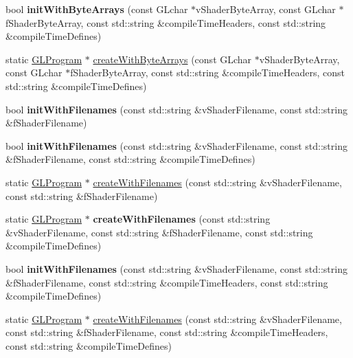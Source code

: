\begin{DoxyCompactItemize}
\item 
\mbox{\label{classGLProgram_a1b576e21f6c54627b93a92a1dfdef7e1}} 
bool {\bfseries init\+With\+Byte\+Arrays} (const G\+Lchar $\ast$v\+Shader\+Byte\+Array, const G\+Lchar $\ast$f\+Shader\+Byte\+Array, const std\+::string \&compile\+Time\+Headers, const std\+::string \&compile\+Time\+Defines)
\item 
static \hyperlink{classGLProgram}{G\+L\+Program} $\ast$ \hyperlink{classGLProgram_a2558f4dd351b6cec829d939e5b31212b}{create\+With\+Byte\+Arrays} (const G\+Lchar $\ast$v\+Shader\+Byte\+Array, const G\+Lchar $\ast$f\+Shader\+Byte\+Array, const std\+::string \&compile\+Time\+Headers, const std\+::string \&compile\+Time\+Defines)
\end{DoxyCompactItemize}
\begin{DoxyCompactItemize}
\item 
\mbox{\label{classGLProgram_a17041a8230ff0ce1c110f05c3f0382c6}} 
bool {\bfseries init\+With\+Filenames} (const std\+::string \&v\+Shader\+Filename, const std\+::string \&f\+Shader\+Filename)
\item 
\mbox{\label{classGLProgram_ab76c957339e44229565377ec53f3e467}} 
bool {\bfseries init\+With\+Filenames} (const std\+::string \&v\+Shader\+Filename, const std\+::string \&f\+Shader\+Filename, const std\+::string \&compile\+Time\+Defines)
\item 
static \hyperlink{classGLProgram}{G\+L\+Program} $\ast$ \hyperlink{classGLProgram_ad09803f1ee7fdb2b215d15ae907e309e}{create\+With\+Filenames} (const std\+::string \&v\+Shader\+Filename, const std\+::string \&f\+Shader\+Filename)
\item 
\mbox{\label{classGLProgram_a7b5e945d8053707e8c7569e8708e1b3b}} 
static \hyperlink{classGLProgram}{G\+L\+Program} $\ast$ {\bfseries create\+With\+Filenames} (const std\+::string \&v\+Shader\+Filename, const std\+::string \&f\+Shader\+Filename, const std\+::string \&compile\+Time\+Defines)
\end{DoxyCompactItemize}
\begin{DoxyCompactItemize}
\item 
\mbox{\label{classGLProgram_a45f1b7217461c14d46aac1a4a062bb8a}} 
bool {\bfseries init\+With\+Filenames} (const std\+::string \&v\+Shader\+Filename, const std\+::string \&f\+Shader\+Filename, const std\+::string \&compile\+Time\+Headers, const std\+::string \&compile\+Time\+Defines)
\item 
static \hyperlink{classGLProgram}{G\+L\+Program} $\ast$ \hyperlink{classGLProgram_a533d98f6e0a1ad17c3480e623992e402}{create\+With\+Filenames} (const std\+::string \&v\+Shader\+Filename, const std\+::string \&f\+Shader\+Filename, const std\+::string \&compile\+Time\+Headers, const std\+::string \&compile\+Time\+Defines)
\end{DoxyCompactItemize}


